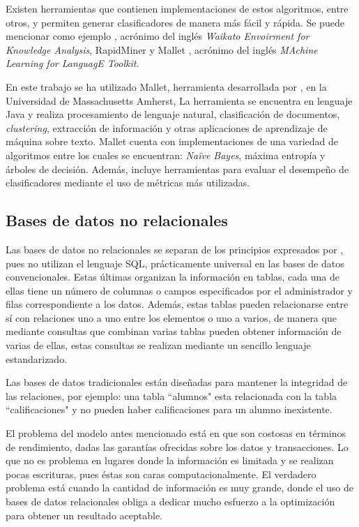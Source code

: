 Existen herramientas que contienen implementaciones de estos algoritmos, entre otros, y permiten generar clasificadores de manera más fácil y rápida. Se puede mencionar como ejemplo \cite{Weka}, acrónimo del inglés \textit{Waikato Envoirment for Knowledge Analysis}, RapidMiner \cite{RapidMiner} y Mallet \cite{Mallet}, acrónimo del inglés \textit{MAchine Learning for LanguagE Toolkit}.

En este trabajo se ha utilizado Mallet, herramienta desarrollada por \cite{Mallet}, en la Universidad de Massachusetts Amherst, La herramienta se encuentra en lenguaje Java y realiza procesamiento de lenguaje natural, clasificación de documentos, \textit{clustering}, extracción de información y otras aplicaciones de aprendizaje de máquina sobre texto. Mallet cuenta con implementaciones de una variedad de algoritmos entre los cuales se encuentran: \textit{Naïve Bayes}, máxima entropía y árboles de decisión. Además, incluye herramientas para evaluar el desempeño de clasificadores mediante el uso de métricas más utilizadas.

\subsection{Bases de datos no relacionales}
\label{subsubsec:BDNoSQL}

Las bases de datos no relacionales se separan de los principios expresados por \cite{CoddSQL}, pues no utilizan el lenguaje SQL, prácticamente universal en las bases de datos convencionales. Estas últimas organizan la información en tablas, cada una de ellas tiene un número de columnas o campos especificados por el administrador y  filas correspondiente a los datos. Además, estas tablas pueden relacionarse entre sí con relaciones uno a uno entre los elementos o uno a varios, de manera que mediante consultas que combinan varias tablas pueden obtener información de varias de ellas, estas consultas se realizan mediante un sencillo lenguaje estandarizado.

Las bases de datos tradicionales están diseñadas para mantener la integridad de las relaciones, por ejemplo: una tabla ``alumnos" esta relacionada con la tabla ``calificaciones" y no pueden haber calificaciones para un alumno inexistente. 

El problema del modelo antes mencionado está en que son costosas en términos de rendimiento, dadas las garantías ofrecidas sobre los datos y transacciones. Lo que no es problema en lugares donde la información es limitada y se realizan pocas escrituras, pues éstas son caras computacionalmente. El verdadero problema está cuando la cantidad de información es muy grande, donde el uso de bases de datos relacionales obliga a dedicar mucho esfuerzo a la optimización para obtener un resultado aceptable.

